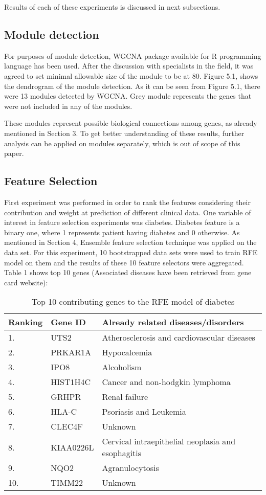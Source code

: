\documentclass{ba-kecs}
\numberwithin{figure}{section}
\numberwithin{equation}{section}
\begin{document}
Results of each of these experiments is discussed in next subsections.

\subsection{Module detection}

For purposes of module detection, WGCNA package available for R programming language has been used. After the discussion with specialists in the field, it was agreed to set minimal allowable size of the module to be at 80. Figure 5.1, shows the dendrogram of the module detection. As it can be seen from Figure 5.1, there were 13 modules detected by WGCNA. Grey module represents the genes that were not included in any of the modules.

These modules represent possible biological connections among genes, as already mentioned in Section 3. To get better understanding of these results, further analysis can be applied on modules separately, which is out of scope of this paper.

\subsection{Feature Selection}

First experiment was performed in order to rank the features considering their contribution and weight at prediction of different clinical data. One variable of interest in feature selection experiments was diabetes. Diabetes feature is a binary one, where 1 represents patient having diabetes and 0 otherwise. As mentioned in Section 4, Ensemble feature selection technique was applied on the data set. For this experiment, 10 bootstrapped data sets were used to train RFE model on them and the results of these 10 feature selectors were aggregated. Table 1 shows top 10 genes (Associated diseases have been retrieved from gene card website):
\begin{table}
\centering
\begin{tabular}{|l|l|p{4cm}|}
\hline
Ranking & Gene ID & Already related diseases/disorders\\ \hline
1. & UTS2 & Atherosclerosis and cardiovascular diseases\\ \hline
2. & PRKAR1A & Hypocalcemia\\ \hline
3. & IPO8 & Alcoholism\\ \hline
4. & HIST1H4C & Cancer and non-hodgkin lymphoma \\ \hline
5. & GRHPR & Renal failure \\ \hline
6. & HLA-C & Psoriasis and Leukemia\\ \hline
7. & CLEC4F & Unknown\\ \hline
8. & KIAA0226L & Cervical intraepithelial neoplasia and esophagitis\\ \hline
9. & NQO2 & Agranulocytosis\\ \hline
10. & TIMM22 & Unknown\\ \hline
\end{tabular}

\caption{Top 10 contributing genes to the RFE model of diabetes}
\label{Top 10 contributing genes to the RFE model of diabetes}
\end{table}
\end{document}
